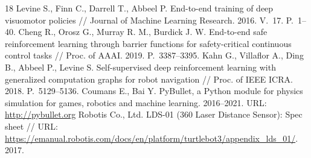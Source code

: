 \documentclass[11pt]{article}
\begin{document}
{\begin{thebibliography}{18}
Levine S., Finn C., Darrell T., Abbeel P. End-to-end training of deep visuomotor policies
// Journal of Machine Learning Research. 2016. V.~17. P.~1--40.
Cheng R., Orosz G., Murray R. M., Burdick J. W. End-to-end safe reinforcement learning through barrier functions for safety-critical continuous control tasks
// Proc. of AAAI. 2019. P.~3387--3395.
Kahn G., Villaflor A., Ding B., Abbeel P., Levine S. Self-supervised deep reinforcement learning with generalized computation graphs for robot navigation // Proc. of IEEE ICRA. 2018. P.~5129--5136.
Coumans E., Bai Y. PyBullet, a Python module for physics simulation for games, robotics and machine learning. 2016--2021. URL: \url{http://pybullet.org}
Robotis Co., Ltd. LDS-01 (360 Laser Distance Sensor): Spec sheet // URL: \url{https://emanual.robotis.com/docs/en/platform/turtlebot3/appendix_lds_01/}. 2017.
\end{thebibliography}}
\end{document}

